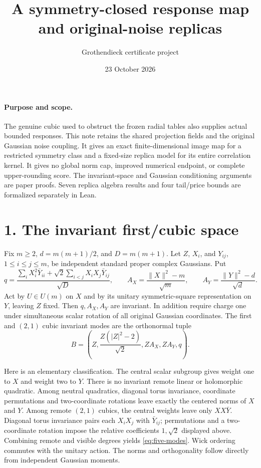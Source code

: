 \documentclass[11pt]{article}
\title{A symmetry-closed response map and original-noise replicas}
\author{Grothendieck certificate project}
\date{23 October 2026}
\begin{document}
\maketitle

\paragraph{Purpose and scope.}
The genuine cubic used to obstruct the frozen radial tables also supplies
actual bounded responses. This note retains the shared projection fields and
the original Gaussian noise coupling. It gives an exact finite-dimensional
image map for a restricted symmetry class and a fixed-size replica model for
its entire correlation kernel. It gives no global norm cap, improved numerical
endpoint, or complete upper-rounding score. The invariant-space and Gaussian
conditioning arguments are paper proofs. Seven replica algebra results and
four tail/price bounds are formalized separately in Lean.

\section*{1. The invariant first/cubic space}
Fix $m\ge2$, $d=m(m+1)/2$, and $D=m(m+1)$. Let $Z$, $X_i$, and $Y_{ij}$,
$1\le i\le j\le m$, be independent standard proper complex Gaussians. Put
\[
 q=\frac{\sum_i X_i^2\bar Y_{ii}
          +\sqrt2\sum_{i<j}X_iX_j\bar Y_{ij}}{\sqrt D},\qquad
 A_X=\frac{\|X\|^2-m}{\sqrt m},\qquad
 A_Y=\frac{\|Y\|^2-d}{\sqrt d}.
\]
Act by $U\in U(m)$ on $X$ and by its unitary symmetric-square representation
on $Y$, leaving $Z$ fixed. Then $q,A_X,A_Y$ are invariant. In addition require
charge one under simultaneous scalar rotation of all original Gaussian
coordinates. The first and $(2,1)$ cubic invariant modes are the orthonormal tuple
\begin{equation}\label{eq:five-modes}
 B=\left(Z,\frac{Z(|Z|^2-2)}{\sqrt2},ZA_X,ZA_Y,q\right).
\end{equation}

Here is an elementary classification. The central scalar subgroup gives weight
one to $X$ and weight two to $Y$. There is no invariant remote linear or
holomorphic quadratic. Among neutral quadratics, diagonal torus invariance,
coordinate permutations and two-coordinate rotations leave exactly the centered
norms of $X$ and $Y$. Among remote $(2,1)$ cubics, the central weights leave only
$XX\bar Y$. Diagonal torus invariance pairs each $X_iX_j$ with $\bar Y_{ij}$;
permutations and a two-coordinate rotation impose the relative coefficients
$1,\sqrt2$ displayed above. Combining remote and visible degrees yields
\eqref{eq:five-modes}. Wick ordering commutes with the unitary action.
The norms and orthogonality follow directly from independent Gaussian moments.
\end{document}
